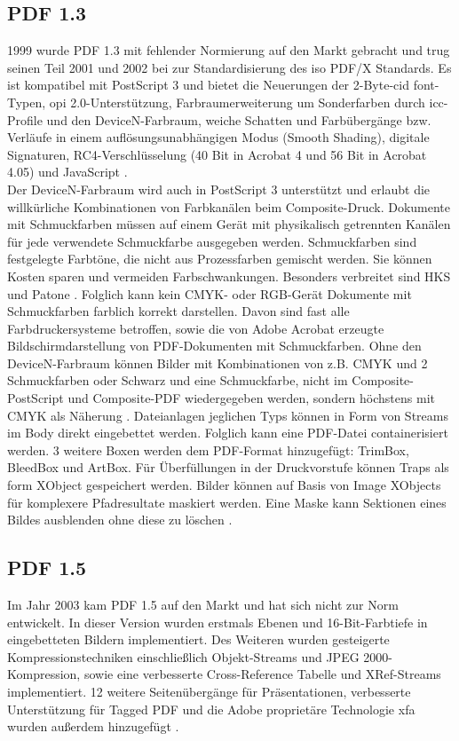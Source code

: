 \subsection{PDF 1.3}
1999 wurde PDF 1.3 mit fehlender Normierung auf den Markt gebracht und trug seinen Teil 2001 und 2002 bei zur Standardisierung des \gls{iso} PDF/X Standards. Es ist kompatibel mit PostScript 3 und bietet die Neuerungen der 2-Byte-\gls{cid} font-Typen, \gls{opi} 2.0-Unterstützung, Farbraumerweiterung um Sonderfarben durch \gls{icc}-Profile und den DeviceN-Farbraum, weiche Schatten und Farbübergänge bzw. Verläufe in einem auflösungsunabhängigen Modus (Smooth Shading), digitale Signaturen, RC4-Verschlüsselung (40 Bit in Acrobat 4 und 56 Bit in Acrobat 4.05) und JavaScript \cite{proj-consult, schneeberger}. \\ 
Der DeviceN-Farbraum wird auch in PostScript 3 unterstützt und erlaubt die willkürliche Kombinationen von Farbkanälen beim Composite-Druck. Dokumente mit Schmuckfarben müssen auf einem Gerät mit physikalisch getrennten Kanälen für jede verwendete Schmuckfarbe ausgegeben werden. Schmuckfarben sind festgelegte Farbtöne, die nicht aus Prozessfarben gemischt werden. Sie können Kosten sparen und vermeiden Farbschwankungen. Besonders verbreitet sind HKS und Patone \cite{kompendium}. Folglich kann kein CMYK- oder RGB-Gerät Dokumente mit Schmuckfarben farblich korrekt darstellen. Davon sind fast alle Farbdruckersysteme betroffen, sowie die von Adobe Acrobat erzeugte Bildschirmdarstellung von PDF-Dokumenten mit Schmuckfarben. Ohne den DeviceN-Farbraum können Bilder mit Kombinationen von z.B. CMYK und 2 Schmuckfarben oder Schwarz und eine Schmuckfarbe, nicht im Composite-PostScript und Composite-PDF wiedergegeben werden, sondern höchstens mit CMYK als Näherung \cite{helios}. 
Dateianlagen jeglichen Typs können in Form von Streams im Body direkt eingebettet werden. Folglich kann eine PDF-Datei containerisiert werden. 3 weitere Boxen werden dem PDF-Format hinzugefügt: TrimBox, BleedBox und ArtBox. Für Überfüllungen in der Druckvorstufe können Traps als form XObject gespeichert werden. Bilder können auf Basis von Image XObjects für komplexere Pfadresultate maskiert werden. Eine Maske kann Sektionen eines Bildes ausblenden ohne diese zu löschen \cite{schneeberger}.

\subsection{PDF 1.5}
Im Jahr 2003 kam PDF 1.5 auf den Markt und hat sich nicht zur Norm entwickelt. In dieser Version wurden erstmals Ebenen und 16-Bit-Farbtiefe in eingebetteten Bildern implementiert. Des Weiteren wurden gesteigerte Kompressionstechniken einschließlich Objekt-Streams und JPEG 2000-Kompression, sowie eine verbesserte Cross-Reference Tabelle und XRef-Streams implementiert. 12 weitere Seitenübergänge für Präsentationen, verbesserte Unterstützung für Tagged PDF und die Adobe proprietäre Technologie \gls{xfa} wurden außerdem hinzugefügt \cite{proj-consult, schneeberger}. 

